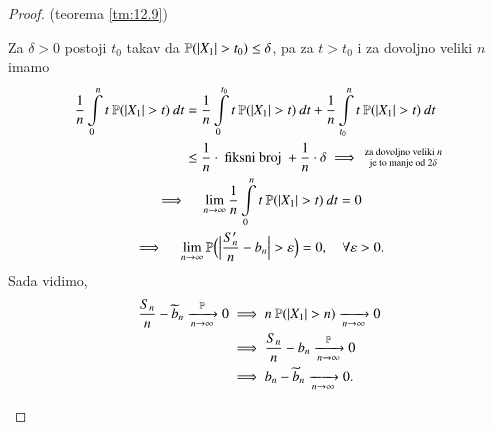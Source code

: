 \begin{proof}{(teorema \ref{tm:12.9})}
\begin{itemize}
        Za $\delta > 0$ postoji $t_0$ takav da $\mathbb{P}({|X_1| > t_0}) \leq \delta$, pa za $t > t_0$ i za dovoljno veliki $n$ imamo
        \begin{equation*}
            \begin{gathered}
                \begin{aligned}
                    \frac{1}{n} \int\limits_0^n t \: \mathbb{P}({|X_1| > t}) \: dt &= \frac{1}{n} \int\limits_0^{t_0} t \: \mathbb{P}({|X_1| > t}) \: dt + \frac{1}{n} \int\limits_{t_0}^n t \: \mathbb{P}({|X_1| > t}) \: dt\\
                    &\leq \frac{1}{n} \cdot \textnormal{ fiksni broj } + \frac{1}{n} \cdot \delta \implies
                    \begin{smallmatrix}
                        \textnormal{za dovoljno veliki } n\\
                        \textnormal{je to manje od } 2 \delta
                    \end{smallmatrix}
                \end{aligned}\\
                \implies \quad \lim\limits_{n \to \infty} \frac{1}{n} \int\limits_0^n t \: \mathbb{P}({|X_1| > t}) \: dt = 0\\
                \implies \quad \lim\limits_{n \to \infty} \mathbb{P} \Big( \Big| \frac{S_n'}{n} -b_n \Big| > \varepsilon \Big) = 0, \quad \forall \varepsilon > 0.
            \end{gathered}
        \end{equation*}
        Sada vidimo,
        \begin{equation*}
            \begin{aligned}
                \frac{S_n}{n} - \widetilde{b}_n \xrightarrow[n \to \infty]{\mathbb{P}} 0 &\implies n \: \mathbb{P}({|X_1| > n}) \xrightarrow[n \to \infty]{} 0\\
                &\implies \frac{S_n}{n} - b_n \xrightarrow[n \to \infty]{\mathbb{P}} 0\\
                &\implies b_n - \widetilde{b}_n \xrightarrow[n \to \infty]{} 0.
            \end{aligned}
        \end{equation*}
    \end{itemize}
\end{proof}

